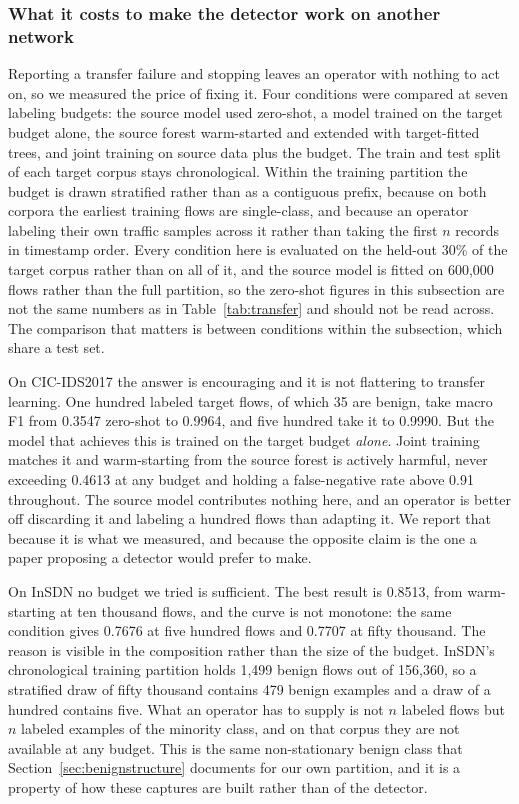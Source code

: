 \documentclass{ieeeaccess}
\begin{document}
\subsubsection{What it costs to make the detector work on another network}
\label{sec:fewshot}
Reporting a transfer failure and stopping leaves an operator with nothing to act
on, so we measured the price of fixing it. Four conditions were compared at seven
labeling budgets: the source model used zero-shot, a model trained on the target
budget alone, the source forest warm-started and extended with target-fitted
trees, and joint training on source data plus the budget. The train and test
split of each target corpus stays chronological. Within the training partition
the budget is drawn stratified rather than as a contiguous prefix, because on
both corpora the earliest training flows are single-class, and because an
operator labeling their own traffic samples across it rather than taking the
first $n$ records in timestamp order. Every condition here is evaluated on the
held-out 30\% of the target corpus rather than on all of it, and the source model
is fitted on 600,000 flows rather than the full partition, so the zero-shot
figures in this subsection are not the same numbers as in
Table~\ref{tab:transfer} and should not be read across. The comparison that
matters is between conditions within the subsection, which share a test set.

On CIC-IDS2017 the answer is encouraging and it is not flattering to transfer
learning. One hundred labeled target flows, of which 35 are benign, take macro
F1 from 0.3547 zero-shot to 0.9964, and five hundred take it to 0.9990. But the
model that achieves this is trained on the target budget \emph{alone}. Joint
training matches it and warm-starting from the source forest is actively harmful,
never exceeding 0.4613 at any budget and holding a false-negative rate above 0.91
throughout. The source model contributes nothing here, and an operator is better
off discarding it and labeling a hundred flows than adapting it. We report that
because it is what we measured, and because the opposite claim is the one a paper
proposing a detector would prefer to make.

On InSDN no budget we tried is sufficient. The best result is 0.8513, from
warm-starting at ten thousand flows, and the curve is not monotone: the same
condition gives 0.7676 at five hundred flows and 0.7707 at fifty thousand. The
reason is visible in the composition rather than the size of the budget. InSDN's
chronological training partition holds 1,499 benign flows out of 156,360, so a
stratified draw of fifty thousand contains 479 benign examples and a draw of a
hundred contains five. What an operator has to supply is not $n$ labeled flows
but $n$ labeled examples of the minority class, and on that corpus they are not
available at any budget. This is the same non-stationary benign class that
Section~\ref{sec:benignstructure} documents for our own partition, and it is a
property of how these captures are built rather than of the detector.
\end{document}
